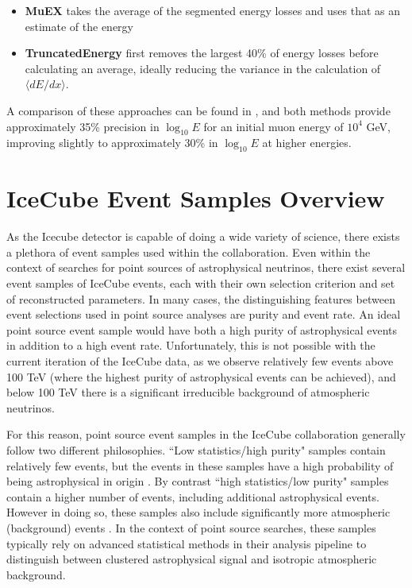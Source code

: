 \begin{itemize}
    \item \textbf{MuEX} takes the average of the segmented energy losses and uses that as an estimate of the energy
    \item \textbf{TruncatedEnergy} first removes the largest 40\% of energy losses before calculating an average, ideally reducing the variance in the calculation of $\langle dE/dx \rangle$. 
\end{itemize}

A comparison of these approaches can be found in \cite{erecopaper}, and both methods provide approximately 35\% precision in $\log_{10}E$ for an initial muon energy of $10^4$ GeV, improving slightly to approximately 30\% in $\log_{10}E$ at higher energies. 

\section{IceCube Event Samples Overview}
As the Icecube detector is capable of doing a wide variety of science, there exists a plethora of event samples used within the collaboration. Even within the context of searches for point sources of astrophysical neutrinos, there exist several event samples of IceCube events, each with their own selection criterion and set of reconstructed parameters. In many cases, the distinguishing features between event selections used in point source analyses are purity and event rate. An ideal point source event sample would have both a high purity of astrophysical events in addition to a high event rate. Unfortunately, this is not possible with the current iteration of the IceCube data, as we observe relatively few events above 100 TeV (where the highest purity of astrophysical events can be achieved), and below 100 TeV there is a significant irreducible background of atmospheric neutrinos. 

For this reason, point source event samples in the IceCube collaboration generally follow two different philosophies. ``Low statistics/high purity" samples contain relatively few events, but the events in these samples have a high probability of being astrophysical in origin \cite{Estes} \cite{hese7yr}. By contrast ``high statistics/low purity" samples contain a higher number of events, including additional astrophysical events. However in doing so, these samples also include significantly more atmospheric (background) events \cite{stettner2019measurement} \cite{10yr_tint}. In the context of point source searches, these samples typically rely on advanced statistical methods in their analysis pipeline to distinguish between clustered astrophysical signal and isotropic atmospheric background. 

